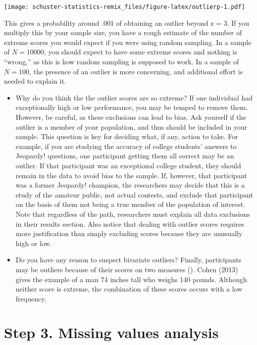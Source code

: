 \documentclass[
]{book}
\begin{document}
\texttt{[image: schuster-statistics-remix\_files/figure-latex/outlierp-1.pdf]}

This gives a probability around .001 of obtaining an outlier beyond z = 3. If you multiply this by your sample size, you have a rough estimate of the number of extreme scores you would expect if you were using random sampling. In a sample of \(N = 10000\), you should expect to have some extreme scores and nothing is ``wrong,'' as this is how random sampling is supposed to work. In a sample of \(N = 100\), the presence of an outlier is more concerning, and additional effort is needed to explain it.

\begin{itemize}
\item
  Why do you think the the outlier scores are so extreme? If one individual had exceptionally high or low performance, you may be temped to remove them. However, be careful, as these exclusions can lead to bias. Ask yourself if the outlier is a member of your population, and thus should be included in your sample. This question is key for deciding what, if any, action to take. For example, if you are studying the accuracy of college students' answers to Jeopardy! questions, one participant getting them all correct may be an outlier. If that participant was an exceptional college student, they should remain in the data to avoid bias to the sample. If, however, that participant was a former Jeopardy! champion, the researchers may decide that this is a study of the amateur public, not actual contests, and exclude that participant on the basis of them not being a true member of the population of interest. Note that regardless of the path, researchers must explain all data exclusions in their results section. Also notice that dealing with outlier scores requires more justification than simply excluding scores because they are unusually high or low.
\item
  Do you have any reason to suspect bivariate outliers? Finally, participants may be outliers because of their scores on two measures (\citet{Cohen2013}). Cohen (2013) gives the example of a man 74 inches tall who weighs 140 pounds. Although neither score is extreme, the combination of these scores occurs with a low frequency.
\end{itemize}

\hypertarget{step-3.-missing-values-analysis}{%
\section{Step 3. Missing values analysis}\label{step-3.-missing-values-analysis}}
\end{document}
